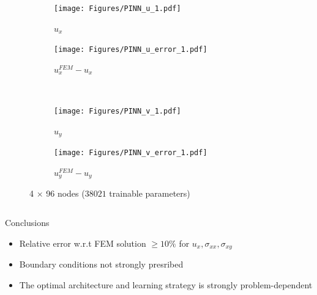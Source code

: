 \documentclass[aspectratio=1610, 10pt]{beamer}
\begin{document}
\begin{frame}
\begin{columns}
\begin{column}{0.48\textwidth}
    \begin{figure}
     \centering
     \begin{subfigure}[b]{0.4\textwidth}
         \centering
         \texttt{[image: Figures/PINN\_u\_1.pdf]}
         \caption{$u_x$}
     \end{subfigure}
     \begin{subfigure}[b]{0.4\textwidth}
         \centering
         \texttt{[image: Figures/PINN\_u\_error\_1.pdf]}
        \caption{$u_x^{FEM} - u_x$}
     \end{subfigure}\\
     \begin{subfigure}[b]{0.4\textwidth}
         \centering
         \texttt{[image: Figures/PINN\_v\_1.pdf]}
        \caption{$u_y$}
     \end{subfigure}
     \begin{subfigure}[b]{0.4\textwidth}
         \centering
         \texttt{[image: Figures/PINN\_v\_error\_1.pdf]}
        \caption{$u_y^{FEM} - u_y$}
     \end{subfigure}
         \caption{\scriptsize{4 $\times$ 96 nodes ($38021$ trainable parameters)}}
     \end{figure}
    \end{column}
    \end{columns} 


    \begin{blueblockshadow}{Conclusions}
    \begin{itemize}
        \item Relative error w.r.t FEM solution $\geq 10\%$ for $u_x, \sigma_{xx}, \sigma_{xy}$
        \item Boundary conditions not strongly presribed
        \item The optimal architecture and learning strategy is strongly problem-dependent
    \end{itemize}
    \end{blueblockshadow}
\end{frame}
\end{document}
